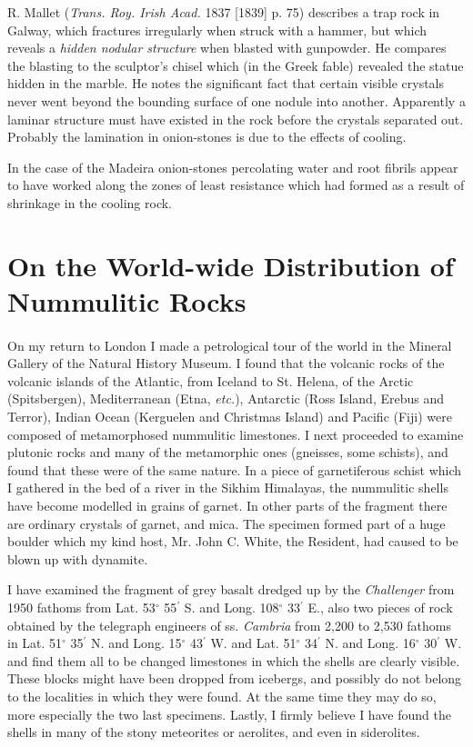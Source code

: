 \documentclass[a4paper, 12pt, oneside]{article}
\begin{document}
R. Mallet (\emph{Trans. Roy. Irish Acad.} 1837 [1839] p. 75) describes a trap rock in Galway, which fractures irregularly when struck with a hammer, but which reveals a \emph{hidden nodular structure} when blasted with gunpowder. He compares the blasting to the sculptor's chisel which (in the Greek fable) revealed the statue hidden in the marble. He notes the significant fact that certain visible crystals never went beyond the bounding surface of one nodule into another. Apparently a laminar structure must have existed in the rock before the crystals separated out. Probably the lamination in onion-stones is due to the effects of cooling.

In the case of the Madeira onion-stones percolating water and root fibrils appear to have worked along the zones of least resistance which had formed as a result of shrinkage in the cooling rock.
\clearpage
\section{On the World-wide Distribution of Nummulitic Rocks}
\paragraph{}
On my return to London I made a petrological tour of the world in the Mineral Gallery of the Natural History Museum. I found that the volcanic rocks of the volcanic islands of the Atlantic, from Iceland to St. Helena, of the Arctic (Spitsbergen), Mediterranean (Etna, \emph{etc.}), Antarctic (Ross Island, Erebus and Terror), Indian Ocean (Kerguelen and Christmas Island) and Pacific (Fiji) were composed of metamorphosed nummulitic limestones. I next proceeded to examine plutonic rocks and many of the metamorphic ones (gneisses, some schists), and found that these were of the same nature. In a piece of garnetiferous schist which I gathered in the bed of a river in the Sikhim Himalayas, the nummulitic shells have become modelled in grains of garnet. In other parts of the fragment there are ordinary crystals of garnet, and mica. The specimen formed part of a huge boulder which my kind host, Mr. John C. White, the Resident, had caused to be blown up with dynamite.

I have examined the fragment of grey basalt dredged up by the \emph{Challenger} from 1950 fathoms from Lat. 53$^{\circ}$ 55$^{\prime}$ S. and Long. 108$^{\circ}$ 33$^{\prime}$ E., also two pieces of rock obtained by the telegraph engineers of ss. \emph{Cambria} from 2,200 to 2,530 fathoms in Lat. 51$^{\circ}$ 35$^{\prime}$ N. and Long. 15$^{\circ}$ 43$^{\prime}$ W. and Lat. 51$^{\circ}$ 34$^{\prime}$ N. and Long. 16$^{\circ}$ 30$^{\prime}$ W. and find them all to be changed limestones in which the shells are clearly visible. These blocks might have been dropped from icebergs, and possibly do not belong to the localities in which they were found. At the same time they may do so, more especially the two last specimens. Lastly, I firmly believe I have found the shells in many of the stony meteorites or aerolites, and even in siderolites.
\end{document}
